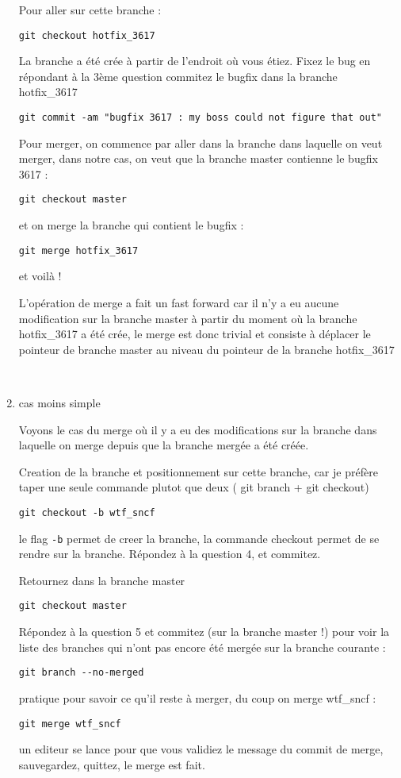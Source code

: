 \documentclass[10pt]{exam}
\begin{document}
\begin{questions}
\begin{enumerate}
Pour aller sur cette branche :
\begin{lstlisting}
git checkout hotfix_3617
\end{lstlisting}

La branche a été crée à partir de l'endroit où vous étiez.
Fixez le bug en répondant à la 3ème question
commitez le bugfix dans la branche hotfix\_3617
\begin{lstlisting}
git commit -am "bugfix 3617 : my boss could not figure that out"
\end{lstlisting}

Pour merger, on commence par aller dans la branche dans laquelle on veut merger, dans notre cas, on veut que la branche master contienne le bugfix 3617 :
\begin{lstlisting}
git checkout master
\end{lstlisting}
et on merge la branche qui contient le bugfix :
\begin{lstlisting}
git merge hotfix_3617
\end{lstlisting}
et voilà !

L'opération de merge a fait un fast forward car il n'y a eu aucune modification sur la branche master à partir du moment où la branche hotfix\_3617 a été crée, le merge est donc trivial et consiste à déplacer le pointeur de branche master au niveau du pointeur de la branche hotfix\_3617

~

\item cas moins simple

Voyons le cas du merge où il y a eu des modifications sur la branche dans laquelle on merge depuis que la branche mergée a été créée.

Creation de la branche et positionnement sur cette branche, car je préfère taper une seule commande plutot que deux ( git branch + git checkout)
\begin{lstlisting}
git checkout -b wtf_sncf
\end{lstlisting}
le flag \texttt{-b} permet de creer la branche, la commande checkout permet de se rendre sur la branche.
Répondez à la question 4, et commitez.

Retournez dans la branche master
\begin{lstlisting}
git checkout master
\end{lstlisting}
Répondez à la question 5 et commitez (sur la branche master !)
%
pour voir la liste des branches qui n'ont pas encore été mergée sur la branche courante :
\begin{lstlisting}
git branch --no-merged
\end{lstlisting}
pratique pour savoir ce qu'il reste à merger, du coup on merge wtf\_sncf :
\begin{lstlisting}
git merge wtf_sncf
\end{lstlisting}
un editeur se lance pour que vous validiez le message du commit de merge, sauvegardez, quittez, le merge est fait.


\end{enumerate}
\end{questions}
\end{document}
